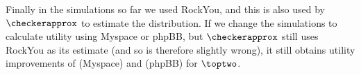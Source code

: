 
Finally in the simulations so far we used RockYou, and this is also used by
$\checkerapprox$ to estimate the distribution. If we change the simulations to
calculate utility using Myspace or phpBB, but $\checkerapprox$ still uses
RockYou as its estimate (and so is therefore slightly wrong), it still obtains
utility improvements of  (Myspace) and  (phpBB) for
$\toptwo$. 

 



\iffalse


  

